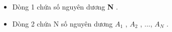 \begin{itemize}
	\item Dòng 1 chứa số nguyên dương \textbf{ N } .
	\item Dòng 2 chứa N số nguyên dương \textbf{ $A_{1}$} , \textbf{ $A_{2}$} , ..., \textbf{ $A_{N}$} .
\end{itemize}